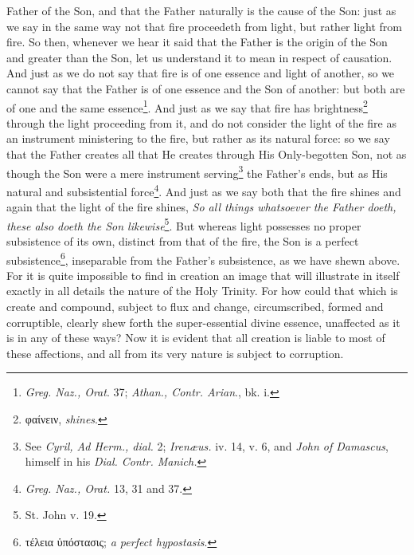 Father of the Son, and that the Father naturally is the cause of the Son: just as we say in the same way not that fire proceedeth from light, but rather light from fire. So then, whenever we hear it said that the Father is the origin of the Son and greater than the Son, let us understand it to mean in respect of causation. And just as we do not say that fire is of one essence and light of another, so we cannot say that the Father is of one essence and the Son of another: but both are of one and the same essence\footnote{\emph{Greg. Naz., Orat}. 37; \emph{Athan., Contr. Arian}., bk. i.}. And just as we say that fire has brightness\footnote{\textgreek{φαίνειν}, \emph{shines}.} through the light proceeding from it, and do not consider the light of the fire as an instrument ministering to the fire, but rather as its natural force: so we say that the Father creates all that He creates through His Only-begotten Son, not as though the Son were a mere instrument serving\footnote{See \emph{Cyril, Ad Herm., dial. }2; \emph{Irenæus. }iv. 14, v. 6, and \emph{John of Damascus}, himself in his \emph{Dial. Contr. Manich.}} the Father’s ends, but as His natural and subsistential force\footnote{\emph{Greg. Naz., Orat. }13, 31 and 37.}. And just as we say both that the fire shines and again that the light of the fire shines, \emph{So all things whatsoever the Father doeth, these also doeth the Son likewise}\footnote{St. John v. 19.}. But whereas light possesses no proper subsistence of its own, distinct from that of the fire, the Son is a perfect subsistence\footnote{\textgreek{τέλεια ὑπόστασις}; \emph{a perfect hypostasis}.}, inseparable from the Father’s subsistence, as we have shewn above. For it is quite impossible to find in creation an image that will illustrate in itself exactly in all details the nature of the Holy Trinity. For how could that which is create and compound, subject to flux and change, circumscribed, formed and corruptible, clearly shew forth the super-essential divine essence, unaffected as it is in any of these ways? Now it is evident that all creation is liable to most of these affections, and all from its very nature is subject to corruption.

